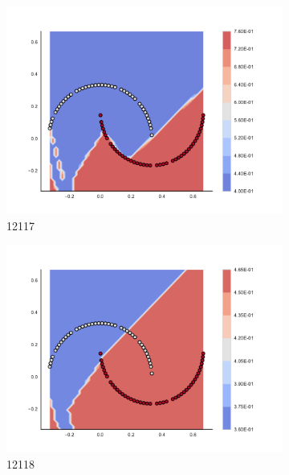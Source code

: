\begin{figure}[h]
\begin{subfigure}[b]{0.09\textwidth}
    \includegraphics[clip, trim=2.35cm 1.75cm 4.5cm 0cm,width=\textwidth]{img/convergence/12117.pdf}
    \caption{12117}
    \label{fig:convergence_12117}
\end{subfigure}
%
\begin{subfigure}[b]{0.09\textwidth}
    \includegraphics[clip, trim=2.35cm 1.75cm 4.5cm 0cm,width=\textwidth]{img/convergence/12118.pdf}
    \caption{12118}
    \label{fig:convergence_12118}
\end{subfigure}
%
\begin{subfigure}[b]{0.09\textwidth}

\end{subfigure}
\end{figure}
